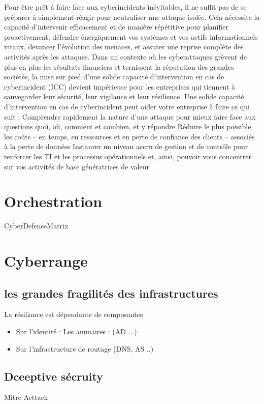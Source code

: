 



Pour être prêt à faire face aux cyberincidents inévitables, il ne suffit pas de se préparer à simplement réagir pour neutraliser une attaque isolée. Cela nécessite la capacité d’intervenir efficacement et de manière répétitive pour planifier proactivement, défendre énergiquement vos systèmes et vos actifs informationnels vitaux, devancer l’évolution des menaces, et assurer une reprise complète des activités après
les attaques.
Dans un contexte où les cyberattaques grèvent de plus en plus les résultats financiers et ternissent la réputation des grandes sociétés, la mise sur pied d’une solide capacité d’intervention en cas de cyberincident (ICC) devient impérieuse pour les entreprises qui tiennent à sauvegarder leur sécurité, leur vigilance et leur résilience. Une solide capacité d’intervention en cas de cyberincident peut aider votre entreprise à faire ce qui suit :
Comprendre rapidement la nature d’une attaque pour mieux faire face aux questions quoi, où, comment et combien, et y répondre
Réduire le plus possible les coûts – en temps, en ressources et en perte de confiance des clients – associés à la perte de données
Instaurer un niveau accru de gestion et de contrôle pour renforcer les TI et les processus opérationnels et, ainsi, pouvoir vous concentrer sur vos activités de base génératrices de valeur

\section{Orchestration}

CyberDefenseMatrix  \cite{dutta2019cyber}

\section{Cyberrange}



\subsection {les grandes fragilités des infrastructures}

La résiliance est dépendante de composantes 
\begin{itemize}
  \item Sur l'identité : Les annuaires : (AD ...)
  \item Sur l'infrastructure de routage (DNS, AS ..)
\end{itemize}

\subsection {Dceeptive sécruity}
Mitre Acttack


